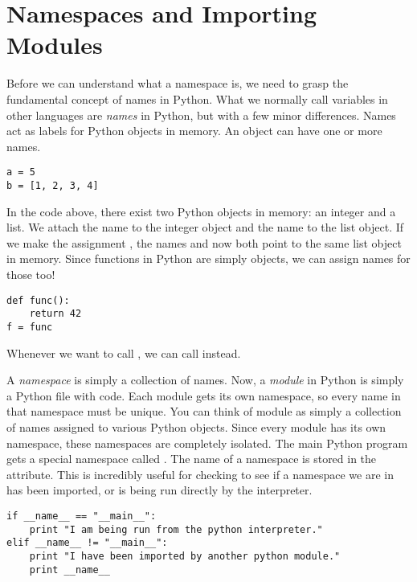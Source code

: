 \section*{Namespaces and Importing Modules}
Before we can understand what a namespace is, we need to grasp the fundamental concept of names in Python.
What we normally call variables in other languages are \emph{names} in Python, but with a few minor differences.
Names act as labels for Python objects in memory.
An object can have one or more names.
\begin{lstlisting}
a = 5
b = [1, 2, 3, 4]
\end{lstlisting}
In the code above, there exist two Python objects in memory: an integer and a list.
We attach the name  to the integer object and the name  to the list object.
If we make the assignment , the names  and  now both point to the same list object in memory.
Since functions in Python are simply objects, we can assign names for those too!
\begin{lstlisting}
def func():
    return 42
f = func
\end{lstlisting}
Whenever we want to call , we can call  instead.

A \emph{namespace} is simply a collection of names.
Now, a \emph{module} in Python is simply a Python file with code.
Each module gets its own namespace, so every name in that namespace must be unique.
You can think of module as simply a collection of names assigned to various Python objects.
Since every module has its own namespace, these namespaces are completely isolated.
The main Python program gets a special namespace called .
The name of a namespace is stored in the  attribute.
This is incredibly useful for checking to see if a namespace we are in has been imported, or is being run directly by the interpreter.
\begin{lstlisting}
if __name__ == "__main__":
    print "I am being run from the python interpreter."
elif __name__ != "__main__":
    print "I have been imported by another python module."
    print __name__
\end{lstlisting}

